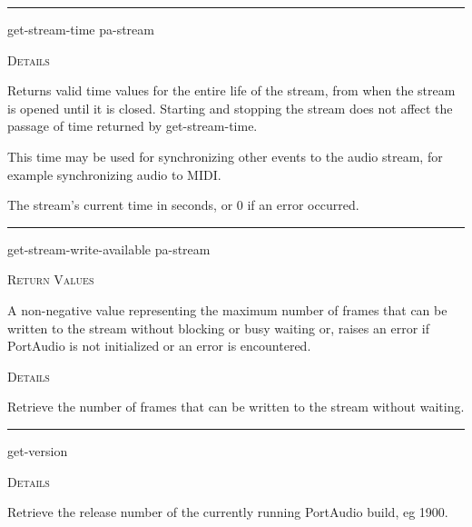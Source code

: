 \documentclass[a4paper]{report}
\begin{document}
  

    \rule{\linewidth}{0.1mm}
    
    \label{portaudio__fun__get-stream-time}
    \begin{defun}[Function]
    get-stream-time pa-stream


	
    \bigskip
    \textsc{Details}

Returns valid time values for the entire life of the stream, from when the stream is opened until it is closed. Starting and stopping the stream does not affect the passage of time returned by get-stream-time.


This time may be used for synchronizing other events to the audio stream, for example synchronizing audio to MIDI.

The stream's current time in seconds, or 0 if an error occurred.


    
    \end{defun}
  
  

    \rule{\linewidth}{0.1mm}
    
    \label{portaudio__fun__get-stream-write-available}
    \begin{defun}[Function]
    get-stream-write-available pa-stream


    
    \bigskip
    \textsc{Return Values}


A non-negative value representing the maximum number of frames that can be written to the stream without blocking or busy waiting or, raises an error if PortAudio is not initialized or an error is encountered. 


	
    \bigskip
    \textsc{Details}

Retrieve the number of frames that can be written to the stream without waiting.




    
    \end{defun}
  
  

    \rule{\linewidth}{0.1mm}
    
    \label{portaudio__fun__get-version}
    \begin{defun}[Function]
    get-version


	
    \bigskip
    \textsc{Details}

Retrieve the release number of the currently running PortAudio build, eg 1900.


    
    \end{defun}
  
\end{document}

